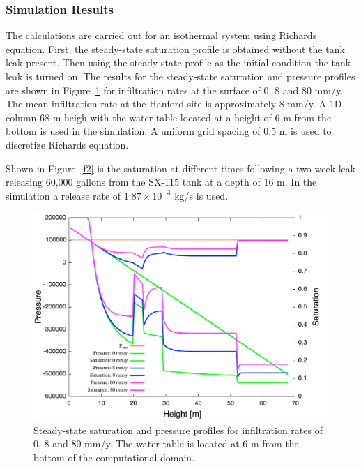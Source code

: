 \subsubsection{Simulation Results}

The calculations are carried out for an isothermal system using Richards equation. First, the steady-state saturation profile is obtained without the tank leak present. Then using the steady-state profile as the initial condition the tank leak is turned on. The results for the steady-state saturation and pressure profiles are shown in Figure~\ref{f1} for infiltration rates at the surface of 0, 8 and 80 mm/y. The mean infiltration rate at the Hanford site is approximately 8 mm/y. A 1D column 68 m heigh with the water table located at a height of 6 m from the bottom is used in the simulation. A uniform grid spacing of 0.5 m is used to discretize Richards equation.

Shown in Figure~\ref{f2} is the saturation at different times following a two week leak releasing 60,000 gallons from the SX-115 tank at a depth of 16 m. In the simulation a release rate of $1.87\!\times\! 10^{-3}$ kg/s is used.


\clearpage

\begin{figure}[h]\centering
\includegraphics[scale=0.45]{./figs/ps}
\caption{Steady-state saturation and pressure profiles for infiltration rates of 0, 8 and 80 mm/y. The water table is located at 6 m from the bottom of the computational domain.}\label{f1}
\end{figure}

